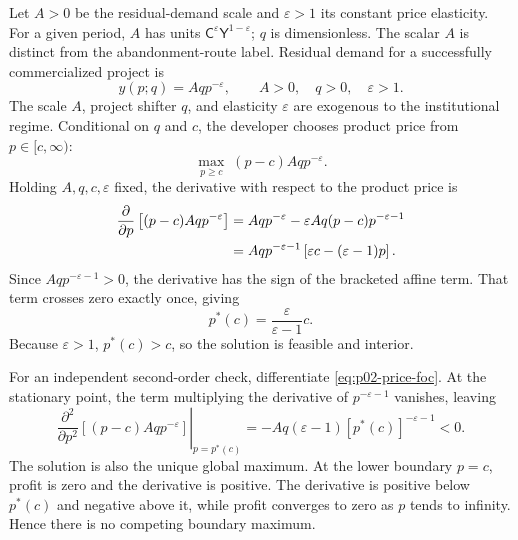 Let \(A>0\) be the residual-demand scale and \(\varepsilon>1\) its
constant price elasticity. For a given period, \(A\) has units
\(\mathsf C^{\varepsilon}\mathsf Y^{1-\varepsilon}\); \(q\) is
dimensionless. The scalar \(A\) is distinct from the abandonment-route
label. Residual demand for a successfully commercialized project is
\begin{equation}
  y(p;q)=Aq p^{-\varepsilon},
  \qquad A>0,\quad q>0,\quad \varepsilon>1.
  \label{eq:p02-demand}
\end{equation}
The scale \(A\), project shifter \(q\), and elasticity \(\varepsilon\) are
exogenous to the institutional regime. Conditional on \(q\) and \(c\), the
developer chooses product price from \(p\in[c,\infty)\):
\begin{equation}
  \max_{p\geq c}\;(p-c)Aq p^{-\varepsilon}.
  \label{eq:p02-pricing-problem}
\end{equation}
Holding \(A,q,c,\varepsilon\) fixed, the derivative with respect to the
product price is
\begin{align}
  \frac{\partial}{\partial p}
  \left[(p-c)Aq p^{-\varepsilon}\right]
  &=Aq p^{-\varepsilon}
    -\varepsilon Aq(p-c)p^{-\varepsilon-1} \notag\\
  &=Aq p^{-\varepsilon-1}
    \left[\varepsilon c-(\varepsilon-1)p\right].
  \label{eq:p02-price-foc}
\end{align}
Since \(Aq p^{-\varepsilon-1}>0\), the derivative has the sign of the
bracketed affine term. That term crosses zero exactly once, giving
\begin{equation}
  p^*(c)=\frac{\varepsilon}{\varepsilon-1}c.
  \label{eq:p02-optimal-price}
\end{equation}
Because \(\varepsilon>1\), \(p^*(c)>c\), so the solution is feasible and
interior.

For an independent second-order check, differentiate
\eqref{eq:p02-price-foc}. At the stationary point, the term multiplying the
derivative of \(p^{-\varepsilon-1}\) vanishes, leaving
\begin{equation}
  \left.
  \frac{\partial^2}{\partial p^2}
  \left[(p-c)Aq p^{-\varepsilon}\right]
  \right|_{p=p^*(c)}
  =-Aq(\varepsilon-1)
   \left[p^*(c)\right]^{-\varepsilon-1}<0.
  \label{eq:p02-price-soc}
\end{equation}
The solution is also the unique global maximum. At the lower boundary
\(p=c\), profit is zero and the derivative is positive. The derivative is
positive below \(p^*(c)\) and negative above it, while profit converges to zero
as \(p\) tends to infinity. Hence there is no competing boundary maximum.

